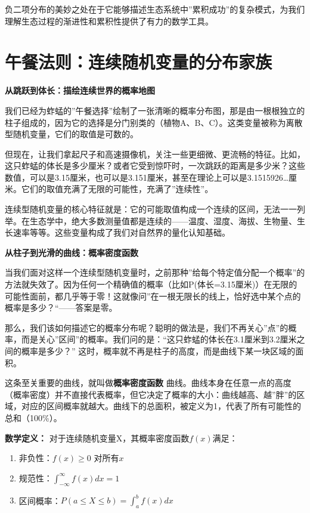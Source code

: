 \documentclass[
]{book}
\providecommand{\tightlist}{%
  \setlength{\itemsep}{0pt}\setlength{\parskip}{0pt}}
\begin{document}
负二项分布的美妙之处在于它能够描述生态系统中''累积成功''的复杂模式，为我们理解生态过程的渐进性和累积性提供了有力的数学工具。

\hypertarget{ux5348ux9910ux6cd5ux5219ux8fdeux7eedux968fux673aux53d8ux91cfux7684ux5206ux5e03ux5bb6ux65cf}{%
\section{午餐法则：连续随机变量的分布家族}\label{ux5348ux9910ux6cd5ux5219ux8fdeux7eedux968fux673aux53d8ux91cfux7684ux5206ux5e03ux5bb6ux65cf}}

\textbf{从跳跃到体长：描绘连续世界的概率地图}

我们已经为蚱蜢的''午餐选择''绘制了一张清晰的概率分布图，那是由一根根独立的柱子组成的，因为它的选择是分门别类的（植物A、B、C）。这类变量被称为离散型随机变量，它们的取值是可数的。

但现在，让我们拿起尺子和高速摄像机，关注一些更细微、更流畅的特征。比如，这只蚱蜢的体长是多少厘米？或者它受到惊吓时，一次跳跃的距离是多少米？这些数值，可以是3.15厘米，也可以是3.151厘米，甚至在理论上可以是3.1515926\ldots 厘米。它们的取值充满了无限的可能性，充满了''连续性''。

连续型随机变量的核心特征就是：它的可能取值构成一个连续的区间，无法一一列举。在生态学中，绝大多数测量值都是连续的------温度、湿度、海拔、生物量、生长速率等等。这些变量构成了我们对自然界的量化认知基础。

\textbf{从柱子到光滑的曲线：概率密度函数}

当我们面对这样一个连续型随机变量时，之前那种''给每个特定值分配一个概率''的方法就失效了。因为任何一个精确值的概率（比如P(体长=3.15厘米)）在无限的可能性面前，都几乎等于零！这就像问''在一根无限长的线上，恰好选中某个点的概率是多少？``------答案是零。

那么，我们该如何描述它的概率分布呢？聪明的做法是，我们不再关心''点''的概率，而是关心''区间''的概率。我们问的是：``这只蚱蜢的体长在3.1厘米到3.2厘米之间的概率是多少？'' 这时，概率就不再是柱子的高度，而是曲线下某一块区域的面积。

这条至关重要的曲线，就叫做\textbf{概率密度函数} 曲线。曲线本身在任意一点的高度（概率密度）并不直接代表概率，但它决定了概率的大小：曲线越高、越''胖''的区域，对应的区间概率就越大。曲线下的总面积，被定义为1，代表了所有可能性的总和（100\%）。

\textbf{数学定义：} 对于连续随机变量X，其概率密度函数\(f(x)\)满足：

\begin{enumerate}
\def\labelenumi{\arabic{enumi}.}
\tightlist
\item
  非负性：\(f(x) \geq 0\) 对所有\(x\)
\item
  规范性：\(\int_{-\infty}^{\infty} f(x) dx = 1\)
\item
  区间概率：\(P(a \leq X \leq b) = \int_a^b f(x) dx\)
\end{enumerate}
\end{document}
